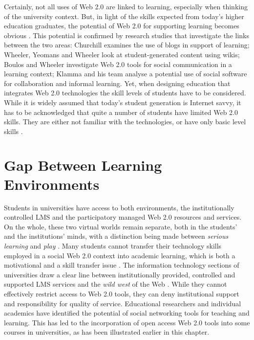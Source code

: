 Certainly, not all uses of Web 2.0 are linked to learning, especially when
thinking of the university context. But, in light of the \LLLs skills expected
from today's higher education graduates, the potential of Web 2.0 for supporting
learning becomes obvious \citep{Tian2011}. This potential is confirmed by
research studies that investigate the links between the two areas: Churchill
\citeyearpar{Churchill2009} examines the use of blogs in support of learning;
Wheeler, Yeomans and Wheeler \citeyearpar{Wheeler2008} look at student-generated
content using wikis; Boulos and Wheeler \citeyearpar{Boulos2007} investigate Web
2.0 tools for social communication in a learning context; Klamma and his team
\citeyearpar{Klamma2007} analyse a potential use of social software for
collaboration and informal learning. Yet, when designing education that
integrates Web 2.0 technologies the skill levels of students have to be
considered. While it is widely assumed that today's student generation is
Internet savvy, it has to be acknowledged that quite a number of students have
limited Web 2.0 skills. They are either not familiar with the technologies, or
have only basic level skills \citep{Kennedy2008,Hosein2010,Jones2010}.

\section{Gap Between Learning Environments}
Students in universities have access to both environments, the institutionally
controlled LMS and the participatory managed Web 2.0 resources and services. On
the whole, these two virtual worlds remain separate, both in the students' and
the institutions' minds, with a distinction being made between \textit{serious
learning} and \textit{play} \citep{Freire2008}. Many students cannot transfer
their technology skills employed in a social Web 2.0 context into academic
learning, which is both a motivational and a skill transfer issue
\citep{Katz2005}. The information technology sections of universities draw a
clear line between institutionally provided, controlled and supported LMS
services and the \textit{wild west} of the Web \citep{Havenstein2007a}. While
they cannot effectively restrict access to Web 2.0 tools, they can deny
institutional support and responsibility for quality of service. Educational
researchers and individual academics have identified the potential of social
networking tools for teaching and learning. This has led to the incorporation of
open access Web 2.0 tools into some courses in universities, as has been
illustrated earlier in this chapter.

